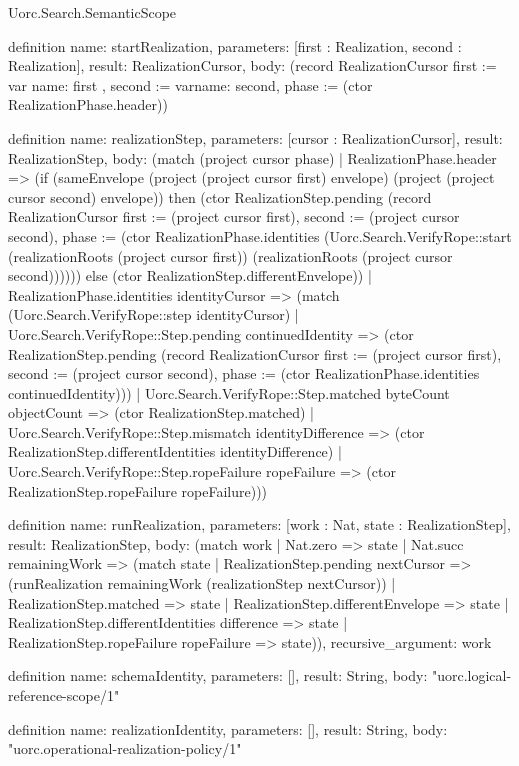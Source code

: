 \begin{lexlean}{Uorc.Search.SemanticScope}
\begin{semanticmodule}
definition{
  name: startRealization,
  parameters: [first : Realization, second : Realization],
  result: RealizationCursor,
  body: (record RealizationCursor {first := var{
    name: first
  }, second := var{name: second}, phase := (ctor RealizationPhase.header)})
}

definition{
  name: realizationStep,
  parameters: [cursor : RealizationCursor],
  result: RealizationStep,
  body: (match (project cursor phase)
    | RealizationPhase.header => (if (sameEnvelope (project (project cursor first) envelope) (project (project cursor second) envelope)) then (ctor RealizationStep.pending (record RealizationCursor {first := (project cursor first), second := (project cursor second), phase := (ctor RealizationPhase.identities (Uorc.Search.VerifyRope::start (realizationRoots (project cursor first)) (realizationRoots (project cursor second))))})) else (ctor RealizationStep.differentEnvelope))
    | RealizationPhase.identities identityCursor => (match (Uorc.Search.VerifyRope::step identityCursor)
      | Uorc.Search.VerifyRope::Step.pending continuedIdentity => (ctor RealizationStep.pending (record RealizationCursor {first := (project cursor first), second := (project cursor second), phase := (ctor RealizationPhase.identities continuedIdentity)}))
      | Uorc.Search.VerifyRope::Step.matched byteCount objectCount => (ctor RealizationStep.matched)
      | Uorc.Search.VerifyRope::Step.mismatch identityDifference => (ctor RealizationStep.differentIdentities identityDifference)
      | Uorc.Search.VerifyRope::Step.ropeFailure ropeFailure => (ctor RealizationStep.ropeFailure ropeFailure)))
}

definition{
  name: runRealization,
  parameters: [work : Nat, state : RealizationStep],
  result: RealizationStep,
  body: (match work
    | Nat.zero => state
    | Nat.succ remainingWork => (match state
      | RealizationStep.pending nextCursor => (runRealization remainingWork (realizationStep nextCursor))
      | RealizationStep.matched => state
      | RealizationStep.differentEnvelope => state
      | RealizationStep.differentIdentities difference => state
      | RealizationStep.ropeFailure ropeFailure => state)),
  recursive_argument: work
}

definition{
  name: schemaIdentity,
  parameters: [],
  result: String,
  body: "uorc.logical-reference-scope/1"
}

definition{
  name: realizationIdentity,
  parameters: [],
  result: String,
  body: "uorc.operational-realization-policy/1"
}


\end{semanticmodule}
\end{lexlean}
